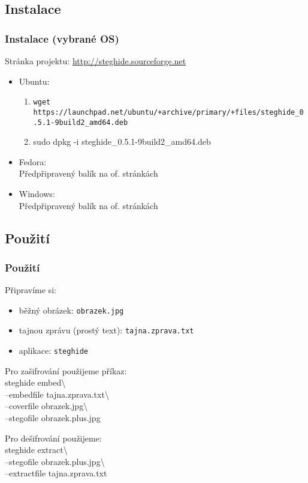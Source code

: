 \documentclass[xetex]{beamer}
\begin{document}
\subsection{Instalace}
\begin{frame}
 \frametitle{Instalace (vybrané OS)}
	Stránka projektu: \url{http://steghide.sourceforge.net}
 \begin{itemize} 
   \item Ubuntu:
			\begin{enumerate}
				\item \scriptsize{\texttt{wget https://launchpad.net/ubuntu/+archive/primary/+files/steghide\_0.5.1-9build2\_amd64.deb}}
				\item \scriptsize{sudo dpkg -i steghide\_0.5.1-9build2\_amd64.deb}
			\end{enumerate}
   \item Fedora:\\
			Předpřipravený balík na of. stránkách
   \item Windows:\\
			Předpřipravený balík na of. stránkách
 \end{itemize} 
\end{frame}

\subsection{Použití}
\begin{frame}
	\frametitle{Použití}
	Připravíme si:
	\begin{itemize}
		\item běžný obrázek: \texttt{obrazek.jpg}
		\item tajnou zprávu (prostý text): \texttt{tajna.zprava.txt}
		\item aplikace: \texttt{steghide}
	\end{itemize}	

Pro zašifrování použijeme příkaz:\\
\scriptsize{steghide embed\textbackslash{} \\ --embedfile tajna.zprava.txt\textbackslash{} \\ --coverfile obrazek.jpg\textbackslash{} \\ --stegofile obrazek.plus.jpg}

Pro dešifrování použijeme:\\
\scriptsize{steghide extract\textbackslash{} \\ --stegofile obrazek.plus.jpg\textbackslash{}\\ --extractfile tajna.zprava.txt}
\end{frame}
\end{document}
